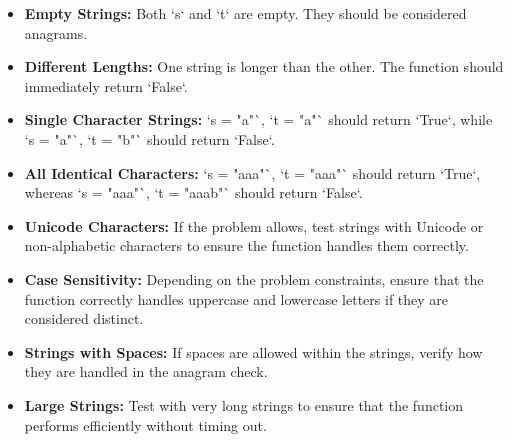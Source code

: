 \begin{itemize}
    \item \textbf{Empty Strings:} Both `s` and `t` are empty. They should be considered anagrams.
    
    \item \textbf{Different Lengths:} One string is longer than the other. The function should immediately return `False`.
    
    \item \textbf{Single Character Strings:} `s = "a"`, `t = "a"` should return `True`, while `s = "a"`, `t = "b"` should return `False`.
    
    \item \textbf{All Identical Characters:} `s = "aaa"`, `t = "aaa"` should return `True`, whereas `s = "aaa"`, `t = "aaab"` should return `False`.
    
    \item \textbf{Unicode Characters:} If the problem allows, test strings with Unicode or non-alphabetic characters to ensure the function handles them correctly.
    
    \item \textbf{Case Sensitivity:} Depending on the problem constraints, ensure that the function correctly handles uppercase and lowercase letters if they are considered distinct.
    
    \item \textbf{Strings with Spaces:} If spaces are allowed within the strings, verify how they are handled in the anagram check.
    
    \item \textbf{Large Strings:} Test with very long strings to ensure that the function performs efficiently without timing out.
\end{itemize}

\printindex